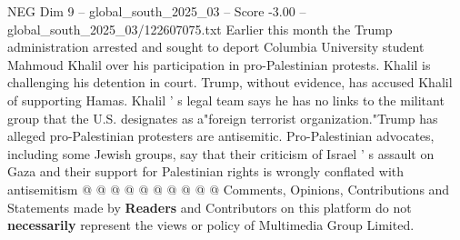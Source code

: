 \begin{textsample}{NEG Dim 9 – global\_south\_2025\_03 – Score -3.00 – global\_south\_2025\_03/122607075.txt}
Earlier this month the Trump administration arrested and sought to deport Columbia University student Mahmoud Khalil over his participation in pro-Palestinian protests.
Khalil is challenging his detention in court.
Trump, without evidence, has accused Khalil of supporting Hamas.
Khalil ' s legal team says he has no links to the militant group that the U.S. designates as a"foreign terrorist organization."Trump has alleged pro-Palestinian protesters are antisemitic.
Pro-Palestinian advocates, including some Jewish groups, say that their criticism of Israel ' s assault on Gaza and their support for Palestinian rights is wrongly conflated with antisemitism @ @ @ @ @ @ @ @ @ @ Comments, Opinions, Contributions and Statements made by \textbf{Readers} and Contributors on this platform do not \textbf{necessarily} represent the views or policy of Multimedia Group Limited.

\end{textsample}
